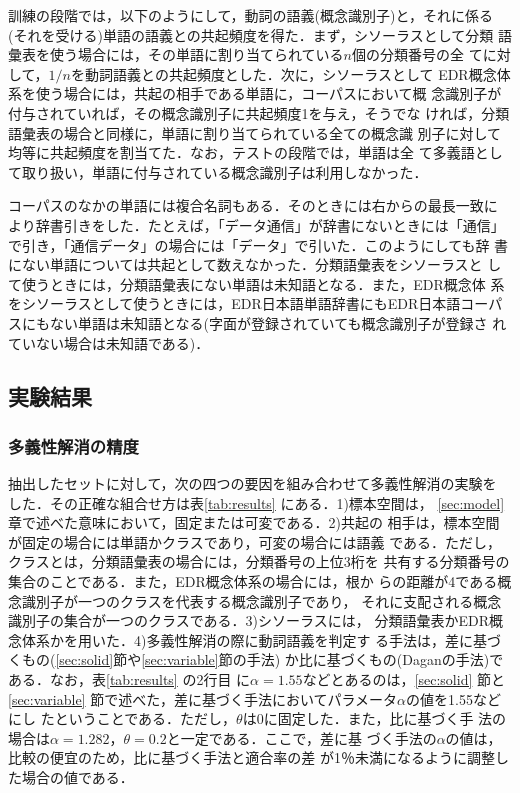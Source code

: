 訓練の段階では，以下のようにして，動詞の語義(概念識別子)と，それに係る
(それを受ける)単語の語義との共起頻度を得た．まず，シソーラスとして分類
語彙表を使う場合には，その単語に割り当てられている$n$個の分類番号の全
てに対して，$1/n$を動詞語義との共起頻度とした．次に，シソーラスとして
EDR概念体系を使う場合には，共起の相手である単語に，コーパスにおいて概
念識別子が付与されていれば，その概念識別子に共起頻度1を与え，そうでな
ければ，分類語彙表の場合と同様に，単語に割り当てられている全ての概念識
別子に対して均等に共起頻度を割当てた．なお，テストの段階では，単語は全
て多義語として取り扱い，単語に付与されている概念識別子は利用しなかった．

コーパスのなかの単語には複合名詞もある．そのときには右からの最長一致に
より辞書引きをした．たとえば，「データ通信」が辞書にないときには「通信」
で引き，「通信データ」の場合には「データ」で引いた．このようにしても辞
書にない単語については共起として数えなかった．分類語彙表をシソーラスと
して使うときには，分類語彙表にない単語は未知語となる．また，EDR概念体
系をシソーラスとして使うときには，EDR日本語単語辞書にもEDR日本語コーパ
スにもない単語は未知語となる(字面が登録されていても概念識別子が登録さ
れていない場合は未知語である)．

\subsection{実験結果}
\label{sec:results}

\subsubsection{多義性解消の精度}

抽出したセットに対して，次の四つの要因を組み合わせて多義性解消の実験を
した．その正確な組合せ方は表\ref{tab:results} にある．1)標本空間は，
\ref{sec:model} 章で述べた意味において，固定または可変である．2)共起の
相手は，標本空間が固定の場合には単語かクラスであり，可変の場合には語義
である．ただし，クラスとは，分類語彙表の場合には，分類番号の上位3桁を
共有する分類番号の集合のことである．また，EDR概念体系の場合には，根か
らの距離が4である概念識別子が一つのクラスを代表する概念識別子であり，
それに支配される概念識別子の集合が一つのクラスである．3)シソーラスには，
分類語彙表かEDR概念体系かを用いた．4)多義性解消の際に動詞語義を判定す
る手法は，差に基づくもの(\ref{sec:solid}節や\ref{sec:variable}節の手法)
か比に基づくもの(Daganの手法)である．なお，表\ref{tab:results} の2行目
に$\alpha = 1.55$などとあるのは，\ref{sec:solid} 節と\ref{sec:variable}
節で述べた，差に基づく手法においてパラメータ$\alpha$の値を1.55などにし
たということである．ただし，$\theta$は0に固定した．また，比に基づく手
法の場合は$\alpha = 1.282$，$\theta = 0.2$と一定である．ここで，差に基
づく手法の$\alpha$の値は，比較の便宜のため，比に基づく手法と適合率の差
が1％未満になるように調整した場合の値である．

